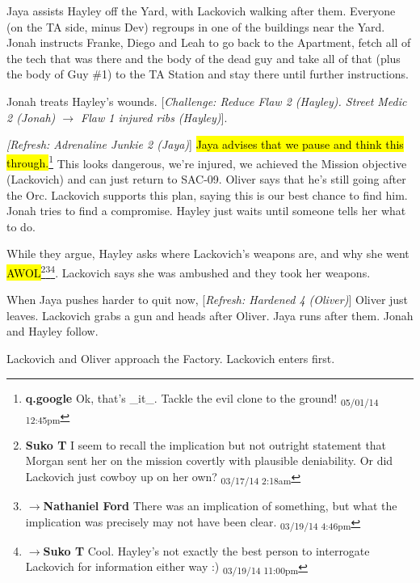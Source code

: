 Jaya assists Hayley off the Yard, with Lackovich walking after them.  Everyone (on the TA side, minus Dev) regroups in one of the buildings near the Yard.  Jonah instructs Franke, Diego and Leah to go back to the Apartment, fetch all of the tech that was there and the body of the dead guy and take all of that (plus the body of Guy \#1) to the TA Station and stay there until further instructions.



Jonah treats Hayley's wounds. {[}\textit{Challenge: Reduce Flaw 2 (Hayley).  Street Medic 2 (Jonah) $\rightarrow$ Flaw 1 injured ribs (Hayley)}{]}. 



\textit{{[}Refresh: Adrenaline Junkie 2 (Jaya)}{]} \hl{Jaya advises that we pause and think this through.}\footnote{\textbf{q.google }Ok, that's \_it\_.  Tackle the evil clone to the ground! \textsubscript{05/01/14 12:45pm}}  This looks dangerous, we're injured, we achieved the Mission objective (Lackovich) and can just return to SAC-09.  Oliver says that he's still going after the Orc.  Lackovich supports this plan, saying this is our best chance to find him.  Jonah tries to find a compromise.  Hayley just waits until someone tells her what to do.



While they argue, Hayley asks where Lackovich's weapons are, and why she went \hl{AWOL}\footnote{\textbf{Suko T }I seem to recall the implication but not outright statement that Morgan sent her on the mission covertly with plausible deniability.  Or did Lackovich just cowboy up on her own? \textsubscript{03/17/14 2:18am}}\footnote{$\rightarrow$\textbf{Nathaniel Ford }There was an implication of something, but what the implication was precisely may not have been clear. \textsubscript{03/19/14 4:46pm}}\footnote{$\rightarrow$\textbf{Suko T }Cool.  Hayley's not exactly the best person to interrogate Lackovich for information either way :) \textsubscript{03/19/14 11:00pm}}.  Lackovich says she was ambushed and they took her weapons.



When Jaya pushes harder to quit now, {[}\textit{Refresh: Hardened 4 (Oliver)}{]}  Oliver just leaves.  Lackovich grabs a gun and heads after Oliver.  Jaya runs after them.  Jonah and Hayley follow.



Lackovich and Oliver approach the Factory.  Lackovich enters first.



